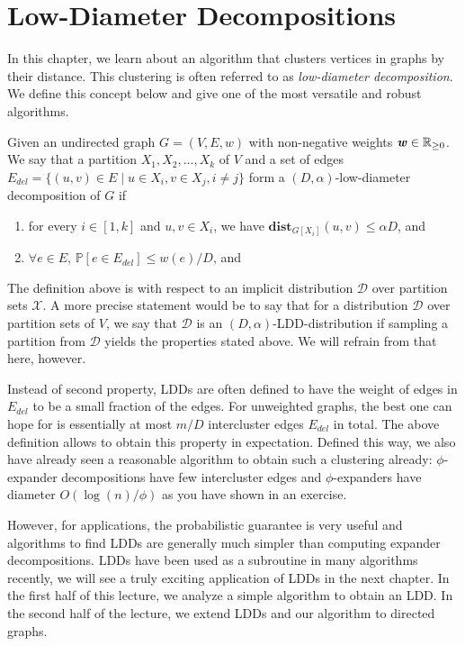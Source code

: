 
\chapter{Low-Diameter Decompositions}

In this chapter, we learn about an algorithm that clusters vertices in graphs by their distance. This clustering is often referred to as \emph{low-diameter decomposition}. We define this concept below and give one of the most versatile and robust algorithms.

\begin{definition}
Given an undirected graph $G = (V,E,w)$ with non-negative weights $\boldsymbol{\mathit{w}} \in \mathbb{R}_{\geq 0}$. We say that a partition $X_1, X_2, \ldots, X_k$ of $V$ and a set of edges $E_{del} = \{ (u,v) \in E \;|\; u \in X_i, v \in X_j, i \neq j\}$ form a $(D, \alpha)$-low-diameter decomposition of $G$ if
\begin{enumerate}
\item for every $i \in [1, k]$ and $u,v \in X_i$, we have $\mathbf{dist}_{G[X_i]}(u,v) \leq \alpha D$, and
\item $\forall e \in E$, $\mathbb{P}[e \in E_{del}] \leq w(e)/ D$, and
\end{enumerate}
\end{definition}
\begin{remark}
The definition above is with respect to an implicit distribution $\mathcal{D}$ over partition sets $\mathcal{X}$. A more precise statement would be to say that for a distribution $\mathcal{D}$ over partition sets of $V$, we say that $\mathcal{D}$ is an $(D, \alpha)$-LDD-distribution if sampling a partition from $\mathcal{D}$ yields the properties stated above. We will refrain from that here, however.
\end{remark}
\begin{remark}
Instead of second property, LDDs are often defined to have the weight of edges in $E_{del}$ to be a small fraction of the edges. For unweighted graphs, the best one can hope for is essentially at most $m/D$ intercluster edges $E_{del}$ in total. The above definition allows to obtain this property in expectation. Defined this way, we also have already seen a reasonable algorithm to obtain such a clustering already: $\phi$-expander decompositions have few intercluster edges and $\phi$-expanders have diameter $O(\log(n)/\phi)$ as you have shown in an exercise.
\end{remark}

However, for applications, the probabilistic guarantee is very useful and algorithms to find LDDs are generally much simpler than computing expander decompositions. LDDs have been used as a subroutine in many algorithms recently, we will see a truly exciting application of LDDs in the next chapter. In the first half of this lecture, we analyze a simple algorithm to obtain an LDD. In the second half of the lecture, we extend LDDs and our algorithm to directed graphs.

